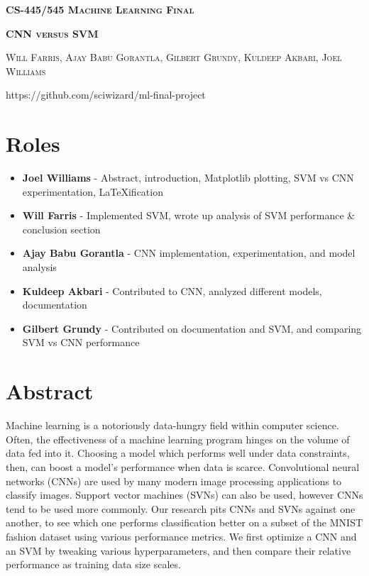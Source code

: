 \documentclass[12pt]{article}
\begin{document}
\begin{center}
{\large \textbf{\textsc{CS-445/545 Machine Learning Final}}}

\bigskip

\large{\textbf{\textsc{CNN versus SVM}}}

\bigskip

\textsc{Will Farris, Ajay Babu Gorantla, Gilbert Grundy, Kuldeep Akbari, Joel Williams}

\bigskip

https://github.com/sciwizard/ml-final-project
\end{center}
\section{Roles}
\begin{itemize}
\item \textbf{Joel Williams} - Abstract, introduction, Matplotlib plotting, SVM vs CNN experimentation, LaTeXification
\item \textbf{Will Farris} - Implemented SVM, wrote up analysis of SVM performance \& conclusion section
\item \textbf{Ajay Babu Gorantla} - CNN implementation, experimentation, and model analysis
\item \textbf{Kuldeep Akbari} - Contributed to CNN, analyzed different models, documentation
\item \textbf{Gilbert Grundy} - Contributed on documentation and SVM, and comparing SVM vs CNN performance
\end{itemize}
\section{Abstract}

Machine learning is a notoriously data-hungry field within computer science. Often, the effectiveness of a machine learning program hinges on the volume of data fed into it. Choosing a model which performs well under data constraints, then, can boost a model’s performance when data is scarce. Convolutional neural networks (CNNs) are used by many modern image processing applications to classify images. Support vector machines (SVNs) can also be used, however CNNs tend to be used more commonly. Our research pits CNNs and SVNs against one another, to see which one performs classification better on a subset of the MNIST fashion dataset using various performance metrics. We first optimize a CNN and an SVM by tweaking various hyperparameters, and then compare their relative performance as training data size scales.
\end{document}

